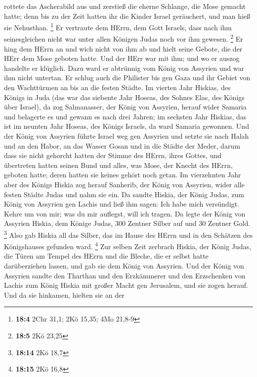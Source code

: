 rottete das Ascherabild aus und zerstieß die eherne Schlange, die Mose
gemacht hatte; denn bis zu der Zeit hatten ihr die Kinder Israel
geräuchert, und man hieß sie Nehusthan. \footnote{\textbf{18:4} 2Chr
  31,1; 2Kö 15,35; 4Mo 21,8-9}  Er vertraute dem HErrn, dem
Gott Israels, dass nach ihm seinesgleichen nicht war unter allen Königen
Judas noch vor ihm gewesen. \footnote{\textbf{18:5} 2Kö 23,25}
 Er hing dem HErrn an und wich nicht von ihm ab und hielt
seine Gebote, die der HErr dem Mose geboten hatte.  Und der
HErr war mit ihm; und wo er auszog handelte er klüglich. Dazu ward er
abtrünnig vom König von Assyrien und war ihm nicht untertan.
 Er schlug auch die Philister bis gen Gaza und ihr Gebiet
von den Wachttürmen an bis an die festen Städte.  Im vierten
Jahr Hiskias, des Königs in Juda (das war das siebente Jahr Hoseas, des
Sohnes Elas, des Königs über Israel), da zog Salmanasser, der König von
Assyrien, herauf wider Samaria und belagerte es  und gewann
es nach drei Jahren; im sechsten Jahr Hiskias, das ist im neunten Jahr
Hoseas, des Königs Israels, da ward Samaria gewonnen.  Und
der König von Assyrien führte Israel weg gen Assyrien und setzte sie
nach Halah und an den Habor, an das Wasser Gosan und in die Städte der
Meder,  darum dass sie nicht gehorcht hatten der Stimme des
HErrn, ihres Gottes, und übertreten hatten seinen Bund und alles, was
Mose, der Knecht des HErrn, geboten hatte; deren hatten sie keines
gehört noch getan.  Im vierzehnten Jahr aber des Königs
Hiskia zog herauf Sanherib, der König von Assyrien, wider alle festen
Städte Judas und nahm sie ein.  Da sandte Hiskia, der König
Judas, zum König von Assyrien gen Lachis und ließ ihm sagen: Ich habe
mich versündigt. Kehre um von mir; was du mir auflegst, will ich tragen.
Da legte der König von Assyrien Hiskia, dem Könige Judas, 300 Zentner
Silber auf und 30 Zentner Gold. \footnote{\textbf{18:14} 2Kö 18,7}
 Also gab Hiskia all das Silber, das im Hause des HErrn und
in den Schätzen des Königshauses gefunden ward. \footnote{\textbf{18:15}
  2Kö 16,8}  Zur selben Zeit zerbrach Hiskia, der König
Judas, die Türen am Tempel des HErrn und die Bleche, die er selbst hatte
darüberziehen lassen, und gab sie dem König von Assyrien. 
Und der König von Assyrien sandte den Tharthan und den Erzkämmerer und
den Erzschenken von Lachis zum König Hiskia mit großer Macht gen
Jerusalem, und sie zogen herauf. Und da sie hinkamen, hielten sie an der
